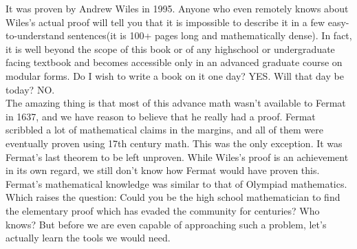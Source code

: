 It was proven by Andrew Wiles in 1995. Anyone who even remotely knows about Wiles’s actual proof will tell you that it is impossible to describe it in a few easy-to-understand sentences(it is 100+ pages long and mathematically dense). In fact, it is well beyond the scope of this book or of any highschool or undergraduate facing textbook and becomes accessible only in an advanced graduate course on modular forms. Do I wish to write a book on it one day? YES. Will that day be today? NO.\\
The amazing thing is that most of this advance math wasn't available to Fermat in 1637, and we have reason to believe that he really had a proof. Fermat scribbled a lot of mathematical claims in the margins, and all of them were eventually proven using 17th century math. This was the only exception. It was Fermat's last theorem to be left unproven. While Wiles's proof is an achievement in its own regard, we still don't know how Fermat would have proven this.\\
Fermat's mathematical knowledge was similar to that of Olympiad mathematics. Which raises the question: Could you be the high school mathematician to find the elementary proof which has evaded the community for centuries? Who knows? But before we are even capable of approaching such a problem, let's actually learn the tools we would need.\\
